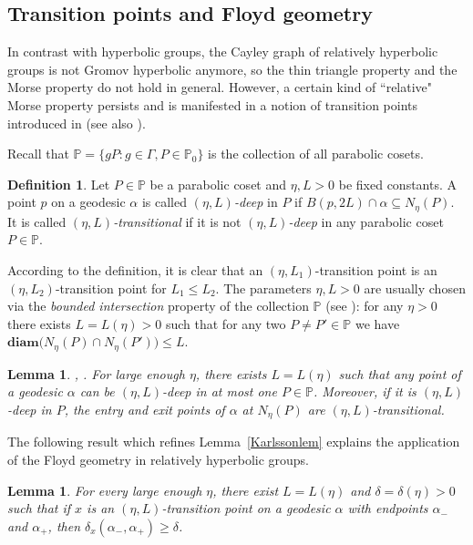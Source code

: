 \documentclass{amsart}
\newtheorem{lem}[thm]{Lemma}
\theoremstyle{definition}
\newtheorem{defn}[thm]{Definition}
\theoremstyle{remark}
\newcommand{\diam }[1]{{\textbf{diam}\big(#1\big)}}
\begin{document}
\subsection{Transition points and Floyd geometry}\label{sectiontransitionpoints}
In contrast with hyperbolic groups, the Cayley graph of relatively hyperbolic groups is not Gromov hyperbolic anymore, so the thin triangle property and the Morse property do not hold in general. However, a certain kind of ``relative" Morse property persists and is manifested in a notion of transition points introduced in \cite{Hruska} (see also \cite{DrutuSapir, GePoGGD}). 

Recall that $\mathbb P=\{gP: g\in \Gamma, P\in\mathbb P_0\}$ is the collection of all parabolic cosets. 
\begin{defn}
Let $P\in\mathbb P$ be a parabolic coset and $\eta, L>0$ be fixed constants. A point $p$ on a geodesic $\alpha$ is called \textit{$(\eta, L)$-deep} in $P$ if $B(p, 2L)\cap \alpha\subseteq N_\eta(P)$. It is called \textit{$(\eta, L)$-transitional} if it is not \textit{$(\eta, L)$-deep} in any parabolic coset $P\in \mathbb P$.  
\end{defn}

According to the definition, it is clear that an $(\eta, L_1)$-transition point is an $(\eta, L_2)$-transition point for $L_1\le L_2.$ 
The parameters $\eta, L>0$ are usually chosen via the \textit{bounded intersection} property of the collection $\mathbb P$ (see \cite[Lemma~4.7]{DrutuSapir}): for any $\eta>0$ there exists $L=L(\eta)>0$ such that for any two $P\ne P'\in\mathbb P$ we have $\diam{N_\eta(P)\cap N_\eta(P')}\le L.$


\begin{lem}\label{EntryTransLem}\cite[Proposition~5.6]{GePoGGD}, \cite[Theorem~4.1]{DrutuSapir}.
For large enough $\eta$, there exists $L=L(\eta)$ such that any point of a geodesic $\alpha$ can  be $(\eta, L)$-deep in at most one  $P\in \mathbb P$. 
Moreover, if it is $(\eta, L)$-deep in $P$, the  entry and exit points of $\alpha$ at $N_\eta(P)$ are $(\eta, L)$-transitional. 
\end{lem}


 

 

The following result which refines Lemma~\ref{Karlssonlem} explains the application of the Floyd geometry in relatively hyperbolic groups. 
\begin{lem}\label{TransLargeLem}\cite[Corollary~5.10]{GePoGGD} 
For every large enough $\eta$, there exist $L=L(\eta)$ and $\delta=\delta(\eta)>0$ such that if $x$ is an $(\eta, L)$-transition point  on a geodesic $\alpha$ with endpoints $\alpha_-$ and $\alpha_+$, then $\delta_{x}(\alpha_-,\alpha_+)\ge \delta$. 
\end{lem}
\end{document}
